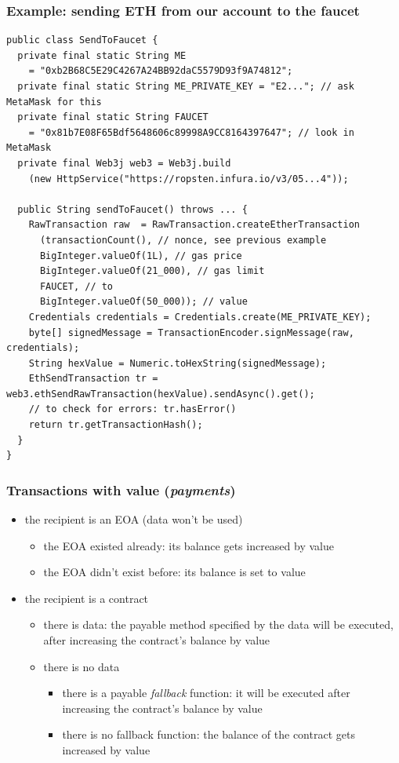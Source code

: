 \documentclass[11pt]{beamer}  %
\begin{document}
\begin{frame}[fragile]\frametitle{Example: sending ETH from our account to the faucet}

{\scriptsize\begin{verbatim}
public class SendToFaucet {
  private final static String ME
    = "0xb2B68C5E29C4267A24BB92daC5579D93f9A74812";
  private final static String ME_PRIVATE_KEY = "E2..."; // ask MetaMask for this
  private final static String FAUCET
    = "0x81b7E08F65Bdf5648606c89998A9CC8164397647"; // look in MetaMask
  private final Web3j web3 = Web3j.build
    (new HttpService("https://ropsten.infura.io/v3/05...4"));

  public String sendToFaucet() throws ... {
    RawTransaction raw  = RawTransaction.createEtherTransaction
      (transactionCount(), // nonce, see previous example
      BigInteger.valueOf(1L), // gas price
      BigInteger.valueOf(21_000), // gas limit
      FAUCET, // to
      BigInteger.valueOf(50_000)); // value
    Credentials credentials = Credentials.create(ME_PRIVATE_KEY);
    byte[] signedMessage = TransactionEncoder.signMessage(raw, credentials);
    String hexValue = Numeric.toHexString(signedMessage);
    EthSendTransaction tr = web3.ethSendRawTransaction(hexValue).sendAsync().get();
    // to check for errors: tr.hasError()
    return tr.getTransactionHash();
  }
}
\end{verbatim}}

\end{frame}

\begin{frame}\frametitle{Transactions with value (\emph{payments})}

  \begin{itemize}
  \item the recipient is an EOA (data won't be used)
    \begin{itemize}
    \item the EOA existed already: its balance gets increased by value
    \item the EOA didn't exist before: its balance is set to value
    \end{itemize}
  \item the recipient is a contract
    \begin{itemize}
    \item there is data: the payable method specified by the data will be executed,
      after increasing the contract's balance by value
    \item there is no data
      \begin{itemize}
      \item there is a payable \emph{fallback} function: it will be executed after
        increasing the contract's balance by value
      \item there is no fallback function: the balance of the contract gets increased by value
      \end{itemize}
    \end{itemize}
  \end{itemize}

\end{frame}
\end{document}
